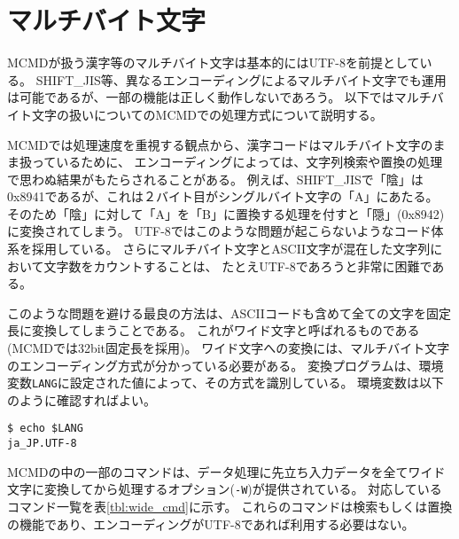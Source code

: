 
%

\section{マルチバイト文字\label{sect:multibyte}}

MCMDが扱う漢字等のマルチバイト文字は基本的にはUTF-8を前提としている。
SHIFT\_JIS等、異なるエンコーディングによるマルチバイト文字でも運用は可能であるが、一部の機能は正しく動作しないであろう。
以下ではマルチバイト文字の扱いについてのMCMDでの処理方式について説明する。

MCMDでは処理速度を重視する観点から、漢字コードはマルチバイト文字のまま扱っているために、
エンコーディングによっては、文字列検索や置換の処理で思わぬ結果がもたらされることがある。
例えば、SHIFT\_JISで「陰」は0x8941であるが、これは２バイト目がシングルバイト文字の「A」にあたる。
そのため「陰」に対して「A」を「B」に置換する処理を付すと「隠」(0x8942)に変換されてしまう。
UTF-8ではこのような問題が起こらないようなコード体系を採用している。
さらにマルチバイト文字とASCII文字が混在した文字列において文字数をカウントすることは、
たとえUTF-8であろうと非常に困難である。

このような問題を避ける最良の方法は、ASCIIコードも含めて全ての文字を固定長に変換してしまうことである。
これがワイド文字と呼ばれるものである(MCMDでは32bit固定長を採用)。
ワイド文字への変換には、マルチバイト文字のエンコーディング方式が分かっている必要がある。
変換プログラムは、環境変数\verb|LANG|に設定された値によって、その方式を識別している。
環境変数は以下のように確認すればよい。

\begin{Verbatim}[baselinestretch=0.7,frame=single]
$ echo $LANG
ja_JP.UTF-8
\end{Verbatim}

MCMDの中の一部のコマンドは、データ処理に先立ち入力データを全てワイド文字に変換してから処理するオプション(\verb|-W|)が提供されている。
対応しているコマンド一覧を表\ref{tbl:wide_cmd}に示す。
これらのコマンドは検索もしくは置換の機能であり、エンコーディングがUTF-8であれば利用する必要はない。

